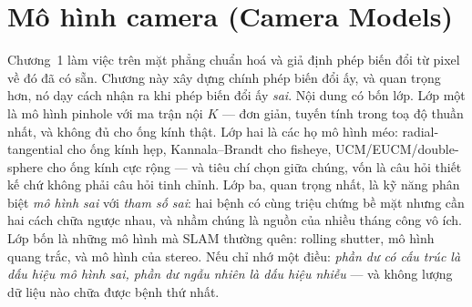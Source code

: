 \documentclass[../../vslam.tex]{subfiles}
\begin{document}
\chapter{Mô hình camera (Camera Models)}

\begin{tomtat}
Chương~1 làm việc trên mặt phẳng chuẩn hoá và giả định phép biến đổi từ pixel về đó đã có sẵn. Chương này xây dựng chính phép biến đổi ấy, và quan trọng hơn, nó dạy cách nhận ra khi phép biến đổi ấy \emph{sai}. Nội dung có bốn lớp. Lớp một là mô hình pinhole với ma trận nội \(K\) --- đơn giản, tuyến tính trong toạ độ thuần nhất, và không đủ cho ống kính thật. Lớp hai là các họ mô hình méo: radial-tangential cho ống kính hẹp, Kannala--Brandt cho fisheye, UCM/EUCM/double-sphere cho ống kính cực rộng --- và tiêu chí chọn giữa chúng, vốn là câu hỏi thiết kế chứ không phải câu hỏi tinh chỉnh. Lớp ba, quan trọng nhất, là kỹ năng phân biệt \emph{mô hình sai} với \emph{tham số sai}: hai bệnh có cùng triệu chứng bề mặt nhưng cần hai cách chữa ngược nhau, và nhầm chúng là nguồn của nhiều tháng công vô ích. Lớp bốn là những mô hình mà SLAM thường quên: rolling shutter, mô hình quang trắc, và mô hình của stereo. Nếu chỉ nhớ một điều: \emph{phần dư có cấu trúc là dấu hiệu mô hình sai, phần dư ngẫu nhiên là dấu hiệu nhiễu} --- và không lượng dữ liệu nào chữa được bệnh thứ nhất.
\end{tomtat}
\end{document}
